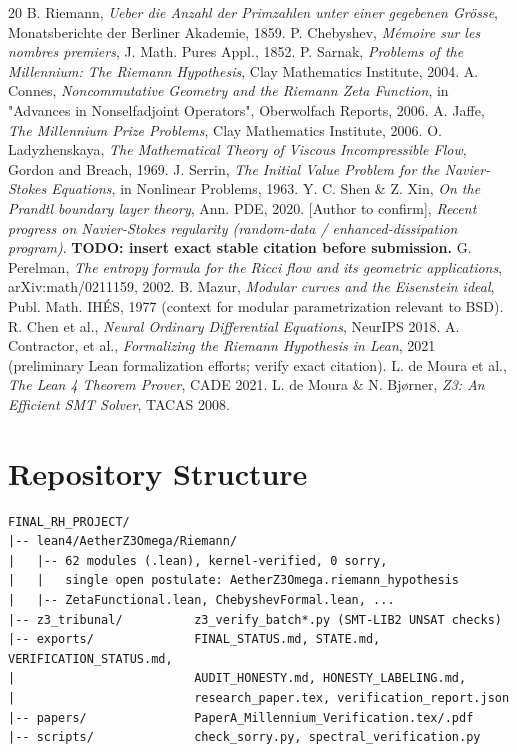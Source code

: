 \documentclass[11pt,a4paper]{article}
\begin{document}
\begin{thebibliography}{20}
 B. Riemann, \textit{Ueber die Anzahl der Primzahlen unter einer gegebenen Gr\"osse}, Monatsberichte der Berliner Akademie, 1859.
 P. Chebyshev, \textit{M\'emoire sur les nombres premiers}, J. Math. Pures Appl., 1852.
 P. Sarnak, \textit{Problems of the Millennium: The Riemann Hypothesis}, Clay Mathematics Institute, 2004.
 A. Connes, \textit{Noncommutative Geometry and the Riemann Zeta Function}, in "Advances in Nonselfadjoint Operators", Oberwolfach Reports, 2006.
 A. Jaffe, \textit{The Millennium Prize Problems}, Clay Mathematics Institute, 2006.
 O. Ladyzhenskaya, \textit{The Mathematical Theory of Viscous Incompressible Flow}, Gordon and Breach, 1969.
 J. Serrin, \textit{The Initial Value Problem for the Navier-Stokes Equations}, in Nonlinear Problems, 1963.
 Y. C. Shen \& Z. Xin, \textit{On the Prandtl boundary layer theory}, Ann. PDE, 2020.
 [Author to confirm], \emph{Recent progress on Navier-Stokes regularity (random-data / enhanced-dissipation program)}. \textbf{TODO: insert exact stable citation before submission.}
 G. Perelman, \textit{The entropy formula for the Ricci flow and its geometric applications}, arXiv:math/0211159, 2002.
 B. Mazur, \textit{Modular curves and the Eisenstein ideal}, Publ. Math. IH\'ES, 1977 (context for modular parametrization relevant to BSD).
 R. Chen et al., \textit{Neural Ordinary Differential Equations}, NeurIPS 2018.
 A. Contractor, et al., \textit{Formalizing the Riemann Hypothesis in Lean}, 2021 (preliminary Lean formalization efforts; verify exact citation).
 L. de Moura et al., \textit{The Lean 4 Theorem Prover}, CADE 2021.
 L. de Moura \& N. Bj{\o}rner, \textit{Z3: An Efficient SMT Solver}, TACAS 2008.
\end{thebibliography}

\appendix
\section{Repository Structure}
\begin{verbatim}
FINAL_RH_PROJECT/
|-- lean4/AetherZ3Omega/Riemann/
|   |-- 62 modules (.lean), kernel-verified, 0 sorry,
|   |   single open postulate: AetherZ3Omega.riemann_hypothesis
|   |-- ZetaFunctional.lean, ChebyshevFormal.lean, ...
|-- z3_tribunal/          z3_verify_batch*.py (SMT-LIB2 UNSAT checks)
|-- exports/              FINAL_STATUS.md, STATE.md, VERIFICATION_STATUS.md,
|                         AUDIT_HONESTY.md, HONESTY_LABELING.md,
|                         research_paper.tex, verification_report.json
|-- papers/               PaperA_Millennium_Verification.tex/.pdf
|-- scripts/              check_sorry.py, spectral_verification.py
\end{verbatim}
\end{document}

